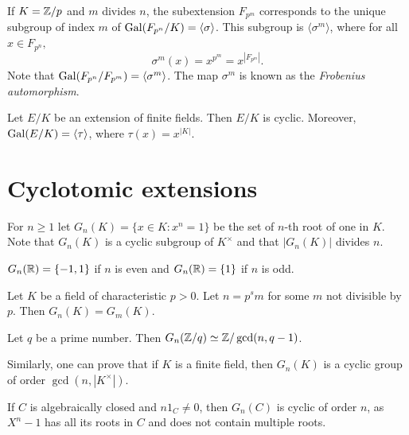 If $K=\mathbb{Z}/p$ and 
$m$ divides $n$, the subextension $F_{p^m}$ corresponds 
to the unique
subgroup of index $m$ of $\operatorname{Gal}(F_{p^n}/K)=\langle\sigma\rangle$. This subgroup
is $\langle\sigma^m\rangle$, where for all $x \in F_{p^n},$
\[
\sigma^m(x)=x^{p^m}=x^{|F_{p^m}|}.
\]
Note that $\operatorname{Gal}(F_{p^n}/F_{p^m})=\langle\sigma^m\rangle$. 
The map $\sigma^m$ is known as 
the \emph{Frobenius automorphism}. 

\begin{exercise}
    Let $E/K$ be an extension of finite fields. Then $E/K$ 
    is cyclic. Moreover, $\operatorname{Gal}(E/K)=\langle\tau\rangle$, where $\tau(x)=x^{|K|}$. 
\end{exercise}




\section{Cyclotomic extensions}

For $n\geq1$ let $G_n(K)=\{x\in K:x^n=1\}$ be the 
set of $n$-th root of one in $K$. Note that
$G_n(K)$ is a cyclic subgroup of $K^{\times}$ and that 
$|G_n(K)|$ divides $n$. 

\begin{example}
    $G_n(\mathbb{R})=\{-1,1\}$ if $n$ is even and $G_{n}(\mathbb{R})=\{1\}$ if $n$ is odd.
\end{example}

\begin{exercise}
    Let $K$ be a field of characteristic $p>0$. Let $n=p^sm$ for some $m$ not divisible by $p$. 
    Then $G_n(K)=G_m(K)$. 
\end{exercise}

\begin{exercise}
    Let $q$ be a prime number. Then $G_n(\mathbb{Z}/q)\simeq\mathbb{Z}/\gcd(n,q-1)$. 
\end{exercise}

Similarly, one can prove that if $K$ is a finite field, then $G_n(K)$ is a cyclic group
of order $\gcd(n,|K^{\times}|)$. 

\begin{example}
    If $C$ is algebraically closed and 
    $n1_C\ne0$, 
    then $G_n(C)$ is cyclic of order $n$, as $X^n-1$ 
    has all its roots in $C$ and does not contain multiple roots. 
\end{example}

